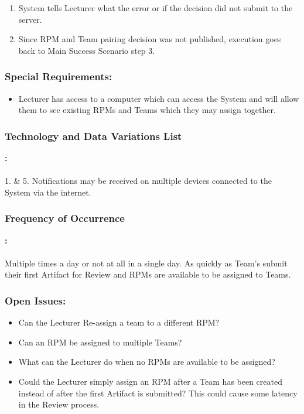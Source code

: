     \begin{enumerate}
        \itemsep-1em 
        \item System tells Lecturer what the error or if the decision did not submit to the server.
        \item Since RPM and Team pairing decision was not published, execution goes back to Main Success Scenario step 3.
    \end{enumerate}
    


\subsubsection*{Special Requirements:}
    \begin{itemize}
    \itemsep-1em 
       \item Lecturer has access to a computer which can access the System and will allow them to see existing RPMs and Teams which they may assign together.
    \end{itemize}
     

     \subsubsection*{Technology and Data Variations List}\textbf{:}
     \\
     \\
     1. \& 5. Notifications may be received on multiple devices connected to the System via
     the internet.
      \\
     
     
     \subsubsection*{Frequency of Occurrence}\textbf{:}
     \\
     \\
     Multiple times a day or not at all in a single day. As quickly as Team’s submit their first Artifact for Review and RPMs are available to be assigned to Teams.
     
     
     
     \subsubsection*{Open Issues:}
    \begin{itemize}
    \itemsep-1em 
       \item Can the Lecturer Re-assign a team to a different RPM?
       \item Can an RPM be assigned to multiple Teams?
       \item What can the Lecturer do when no RPMs are available to be assigned?
       \item Could the Lecturer simply assign an RPM after a Team has been created instead of after the first Artifact is submitted? This could cause some latency in the Review process.
    \end{itemize}









